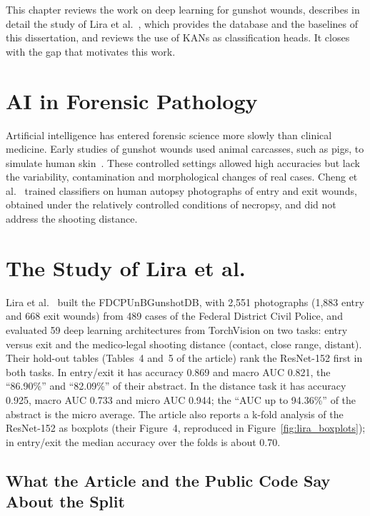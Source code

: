 \label{chap:related}

This chapter reviews the work on deep learning for gunshot wounds, describes in detail the study of Lira et al.~\cite{Lira2025deep}, which provides the database and the baselines of this dissertation, and reviews the use of KANs as classification heads. It closes with the gap that motivates this work.

\section{AI in Forensic Pathology}
\label{sec:ai_forensics}

Artificial intelligence has entered forensic science more slowly than clinical medicine. Early studies of gunshot wounds used animal carcasses, such as pigs, to simulate human skin~\cite{oura2021deep}. These controlled settings allowed high accuracies but lack the variability, contamination and morphological changes of real cases. Cheng et al.~\cite{cheng2024gunshot} trained classifiers on human autopsy photographs of entry and exit wounds, obtained under the relatively controlled conditions of necropsy, and did not address the shooting distance.

\section{The Study of Lira et al.}
\label{sec:2024_benchmark}

Lira et al.~\cite{Lira2025deep} built the FDCPUnBGunshotDB, with 2,551 photographs (1,883 entry and 668 exit wounds) from 489 cases of the Federal District Civil Police, and evaluated 59 deep learning architectures from TorchVision on two tasks: entry versus exit and the medico-legal shooting distance (contact, close range, distant). Their hold-out tables (Tables~4 and~5 of the article) rank the ResNet-152 first in both tasks. In entry/exit it has accuracy 0.869 and macro AUC 0.821, the ``86.90\%'' and ``82.09\%'' of their abstract. In the distance task it has accuracy 0.925, macro AUC 0.733 and micro AUC 0.944; the ``AUC up to 94.36\%'' of the abstract is the micro average. The article also reports a k-fold analysis of the ResNet-152 as boxplots (their Figure~4, reproduced in Figure~\ref{fig:lira_boxplots}); in entry/exit the median accuracy over the folds is about 0.70.

\subsection{What the Article and the Public Code Say About the Split}


